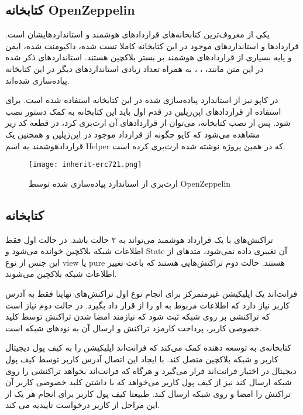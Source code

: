 \subsection{کتابخانه OpenZeppelin}
یکی از معروف‌ترین کتابخانه‌های قراردادهای هوشمند و استانداردهایشان است. قراردادها و استانداردهای موجود در این کتابخانه کاملا تست شده، داکیومنت شده، ایمن و پایه بسیاری از قراردادهای هوشمند بر بستر بلاکچین هستند.
استانداردهای ذکر شده در این متن مانند،
،
،
به همراه تعداد زیادی استانداردهای دیگر در این کتابخانه پیاده‌سازی شده‌اند.

در کاپو نیز از استاندارد
پیاده‌سازی شده در این کتابخانه استفاده شده است. برای استفاده از قرارداد‌های اپن‌زپلین در قدم اول باید این کتابخانه به کمک دستور
نصب شود. پس از نصب کتابخانه، می‌توان از قراردادهای آن ارث‌بری کرد، در قطعه کد زیر مشاهده می‌شود که کاپو چگونه از قرارداد
موجود در اپن‌زپلین و همچنین یک قراردادهوشمند به اسم Helper که در همین پروژه نوشته شده ارث‌بری کرده است.

\begin{figure}[ht]
\centerline{\texttt{[image: inherit-erc721.png]}}
\caption{ارث‌بری از استاندارد  پیاده‌سازی شده توسط OpenZeppelin}
\label{fig:inherit-erc721}
\end{figure}

\subsection{کتابخانه }
تراکنش‌های با یک قرارداد هوشمند می‌تواند به ۲ حالت باشد. در حالت اول فقط اطلاعات شبکه بلاکچین خوانده می‌شود و
\gls{State}
آن تغییری داده نمی‌شود، متدهای از این جنس از نوع view یا pure هستند. حالت دوم تراکنش‌هایی هستند که باعث تغییر اطلاعات شبکه بلاکچین می‌شوند.

فرانت‌اند یک اپلیکیشن غیرمتمرکز برای انجام نوع اول تراکنش‌های نهایتا فقط به آدرس کاربر نیاز دارد که اطلاعات مربوط به او را از قرار داد بگیرد. در حالت دوم نیاز است که تراکنشی بر روی شبکه ثبت شود که نیازمند امضا شدن تراکنش توسط کلید خصوصی کاربر، پرداخت کارمزد تراکنش و ارسال آن به نودهای شبکه است.

کتابخانه‌ی
به توسعه دهنده کمک می‌کند که فرانت‌اند اپلیکیشن را به کیف پول دیجیتال کاربر و شبکه بلاکچین متصل کند. با ایجاد این اتصال آدرس کاربر توسط کیف پول دیجیتال در اختیار فرانت‌اند قرار می‌گیرد و هرگاه که فرانت‌اند بخواهد تراکنشی را روی شبکه ارسال کند نیز از کیف پول کاربر می‌خواهد که با داشتن کلید خصوصی کاربر آن تراکنش را امضا و روی شبکه ارسال کند. طبیعتا کیف پول کاربر برای انجام هر یک از این مراحل از کاربر درخواست تاییدیه می کند.


